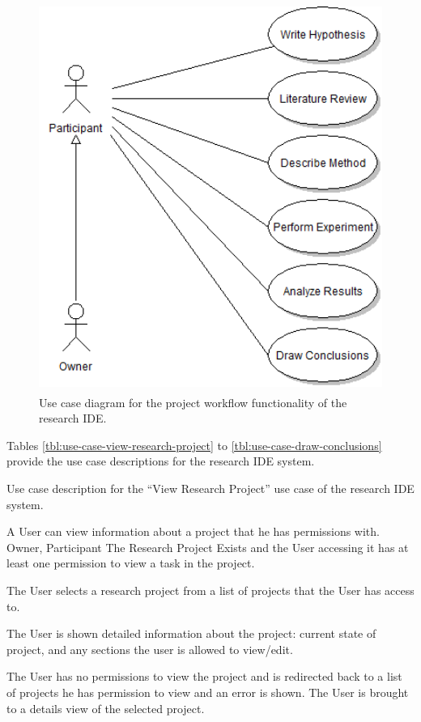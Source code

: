\begin{figure}[!ht]
\centering \includegraphics[height=5in]{./img/case-study-research-railgun/project_workflow_use_case}
\caption{Use case diagram for the project workflow functionality of the research IDE.}
\label{fig:case-research-use-case-project-workflow}
\end{figure}

\FloatBarrier


Tables \ref{tbl:use-case-view-research-project} to \ref{tbl:use-case-draw-conclusions} provide the use case descriptions for the research IDE system. 
 

\begin{table}
  \centering
  \caption{Use case description for the ``View Research Project'' use case of the research IDE system.}
  \label{tbl:use-case-view-research-project}

  \begin{usecase}
    A User can view information about a project that he has permissions with.
    Owner, Participant
    The Research Project Exists and the User accessing it has at least one permission to view a task in the project.
    \ucnormal
    \begin{ucenum}
      \item The User selects a research project from a list of projects that the User has access to.
      \item The User is shown detailed information about the project: current state of project, and any sections the user is allowed to view/edit.
    \end{ucenum}
    The User has no permissions to view the project and is redirected back to a list of projects he has permission to view and an error is shown.
    The User is brought to a details view of the selected project.
  \end{usecase}
\end{table}


